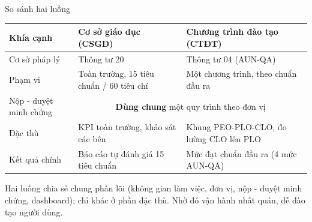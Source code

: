 \documentclass[aspectratio=169, 11pt]{beamer}
\begin{document}
\begin{frame}{So sánh hai luồng}
\vspace{0.1cm}
{\scriptsize
\begin{tabularx}{\textwidth}{@{}p{3.2cm}XX@{}}
\toprule
\textbf{Khía cạnh} & \textbf{\color{daumaroon}Cơ sở giáo dục (CSGD)} & \textbf{\color{daunavy}Chương trình đào tạo (CTĐT)} \\
\midrule
Cơ sở pháp lý & Thông tư 20 & Thông tư 04 (AUN-QA) \\
Phạm vi & Toàn trường, 15 tiêu chuẩn / 60 tiêu chí & Một chương trình, theo chuẩn đầu ra \\
Nộp - duyệt minh chứng & \multicolumn{2}{c}{\cellcolor{lightwarm}\textbf{Dùng chung} một quy trình theo đơn vị} \\
Đặc thù & KPI toàn trường, khảo sát các bên & Khung PEO-PLO-CLO, đo lường CLO lên PLO \\
Kết quả chính & Báo cáo tự đánh giá 15 tiêu chuẩn & Mức đạt chuẩn đầu ra (4 mức AUN-QA) \\
\bottomrule
\end{tabularx}}
\vspace{0.12cm}
\begin{keypoint}
Hai luồng chia sẻ chung phần lõi (không gian làm việc, đơn vị, nộp - duyệt minh chứng, dashboard); chỉ khác ở phần đặc thù. Nhờ đó vận hành nhất quán, dễ đào tạo người dùng.
\end{keypoint}
\end{frame}
\end{document}
